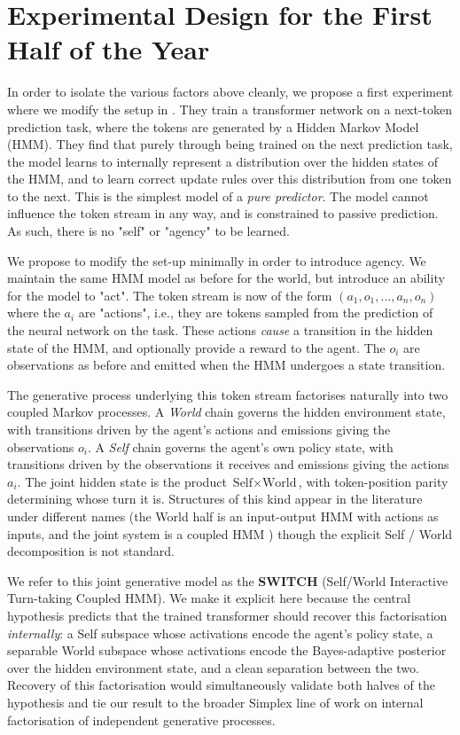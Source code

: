 \documentclass[11pt]{article}
\begin{document}
\section*{Experimental Design for the First Half of the Year}

In order to isolate the various factors above cleanly, we propose a first experiment where we modify the setup in \citet{shai2024belief}. They train a transformer network on a next-token prediction task, where the tokens are generated by a Hidden Markov Model (HMM). They find that purely through being trained on the next prediction task, the model learns to internally represent a distribution over the hidden states of the HMM, and to learn correct update rules over this distribution from one token to the next. This is the simplest model of a \emph{pure predictor}. The model cannot influence the token stream in any way, and is constrained to passive prediction. As such, there is no "self" or "agency" to be learned. 

We propose to modify the set-up minimally in order to introduce agency. We maintain the same HMM model as before for the world, but introduce an ability for the model to "act". The token stream is now of the form $(a_1,o_1,\dots,a_n,o_n)$ where the $a_i$ are "actions", i.e., they are tokens sampled from the prediction of the neural network on the task. These actions \emph{cause} a transition in the hidden state of the HMM, and optionally provide a reward to the agent. The $o_i$ are observations as before and emitted when the HMM undergoes a state transition.

The generative process underlying this token stream factorises naturally into two coupled Markov processes. A \emph{World} chain governs the hidden environment state, with transitions driven by the agent's actions and emissions giving the observations $o_i$. A \emph{Self} chain governs the agent's own policy state, with transitions driven by the observations it receives and emissions giving the actions $a_i$. The joint hidden state is the product $\text{Self} \times \text{World}$, with token-position parity determining whose turn it is. Structures of this kind appear in the literature under different names (the World half is an input-output HMM \citep{bengio1995iohmm} with actions as inputs, and the joint system is a coupled HMM \citep{brand1996coupled}) though the explicit Self / World decomposition is not standard. 

We refer to this joint generative model as the \textbf{SWITCH} (Self/World Interactive Turn-taking Coupled HMM). We make it explicit here because the central hypothesis predicts that the trained transformer should recover this factorisation \emph{internally}: a Self subspace whose activations encode the agent's policy state, a separable World subspace whose activations encode the Bayes-adaptive posterior over the hidden environment state, and a clean separation between the two. Recovery of this factorisation would simultaneously validate both halves of the hypothesis and tie our result to the broader Simplex line of work on internal factorisation of independent generative processes.
\end{document}
